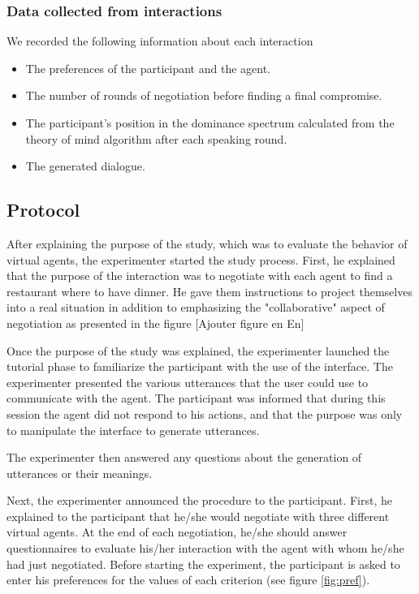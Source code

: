 \documentclass[10pt, a4paper, twocolumn]{article} %
\begin{document}
	
	\subsubsection{Data collected from interactions}
	We recorded the following information about each interaction
	\begin{itemize}
		\item The preferences of the participant and the agent.
		\item The number of rounds of negotiation before finding a final compromise.
		\item The participant's position in the dominance spectrum calculated from the theory of mind algorithm after each speaking round.
		\item The generated dialogue.
		
	\end{itemize}
		
		
		\subsection{Protocol}
		\label{sec:proto}
		After explaining the purpose of the study, which was to evaluate the behavior of virtual agents, the experimenter started the study process. 
		First, he explained that the purpose of the interaction was to negotiate with each agent to find a restaurant where to have dinner. He gave them instructions to project themselves into a real situation in addition to emphasizing the "collaborative" aspect of negotiation as presented in the figure %
		[Ajouter figure en En]
		
		
		Once the purpose of the study was explained, the experimenter launched the tutorial phase to familiarize the participant with the use of the interface. The experimenter presented the various utterances that the user could use to communicate with the agent. 	
		The participant was informed that during this session the agent did not respond to his actions, and that the purpose was only to manipulate the interface to generate utterances. 
		
		The experimenter then answered any questions about the generation of utterances or their meanings.
		
		Next, the experimenter announced the procedure to the participant. First, he explained to the participant that he/she would negotiate with three different virtual agents. At the end of each negotiation, he/she should answer  questionnaires to evaluate his/her interaction with the agent with whom he/she had just negotiated.
		Before starting the experiment, the participant is asked to enter his preferences for the values of each criterion (see figure \ref{fig:pref}).
		
\end{document}
